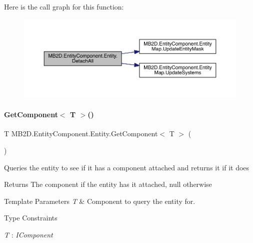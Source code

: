 Here is the call graph for this function\+:
\nopagebreak
\begin{figure}[H]
\begin{center}
\leavevmode
\includegraphics[width=350pt]{class_m_b2_d_1_1_entity_component_1_1_entity_a5c006a368383ba7b17653d9f958ceaf8_cgraph}
\end{center}
\end{figure}
\hypertarget{class_m_b2_d_1_1_entity_component_1_1_entity_a637f3b4df5ecd5d4e6c7630740d1676f}{}\label{class_m_b2_d_1_1_entity_component_1_1_entity_a637f3b4df5ecd5d4e6c7630740d1676f} 
\paragraph{\texorpdfstring{Get\+Component$<$ T $>$()}{GetComponent< T >()}}
{\footnotesize\ttfamily T M\+B2\+D.\+Entity\+Component.\+Entity.\+Get\+Component$<$ T $>$ (\begin{DoxyParamCaption}{ }\end{DoxyParamCaption})\hspace{0.3cm}{\ttfamily [inline]}}



Queries the entity to see if it has a component attached and returns it if it does 

\begin{DoxyReturn}{Returns}
The component if the entity has it attached, null otherwise
\end{DoxyReturn}

\begin{DoxyTemplParams}{Template Parameters}
{\em T} & Component to query the entity for.\\
\hline
\end{DoxyTemplParams}
\begin{Desc}
\item[Type Constraints]\begin{description}
\item[{\em T} : {\em I\+Component}]\end{description}
\end{Desc}
\hypertarget{class_m_b2_d_1_1_entity_component_1_1_entity_a8bbe196918b2eb4fe2102285c310ced3}{}\label{class_m_b2_d_1_1_entity_component_1_1_entity_a8bbe196918b2eb4fe2102285c310ced3} 
